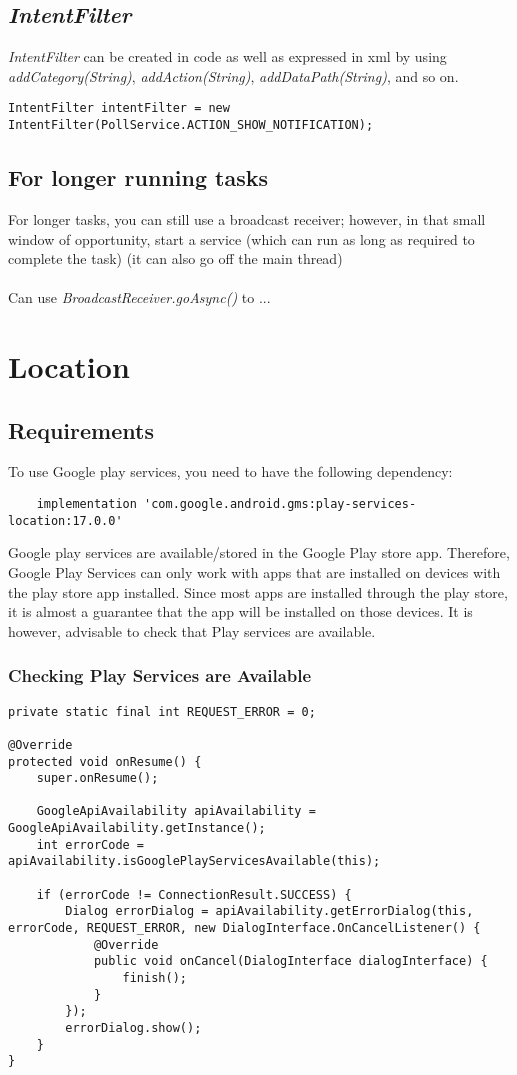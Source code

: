 \documentclass[]{article}
\renewcommand{\it}[1]{\textit{#1}}
\begin{document}
\subsection{\it{IntentFilter}}
\it{IntentFilter} can be created in code as well as expressed in xml by using \it{addCategory(String)}, \it{addAction(String)}, \it{addDataPath(String)}, and so on.
\begin{lstlisting}
IntentFilter intentFilter = new IntentFilter(PollService.ACTION_SHOW_NOTIFICATION);
\end{lstlisting}

\subsection{For longer running tasks}
For longer tasks, you can still use a broadcast receiver; however, in that small window of opportunity, start a service (which can run as long as required to complete the task) (it can also go off the main thread)
\\\\
Can use \it{BroadcastReceiver.goAsync()} to ...

\section{Location}
\subsection{Requirements}
To use Google play services, you need to have the following dependency:
\begin{lstlisting}
    implementation 'com.google.android.gms:play-services-location:17.0.0'
\end{lstlisting}
Google play services are available/stored in the Google Play store app.  Therefore, Google Play Services can only work with apps that are installed on devices with the play store app installed.  Since most apps are installed through the play store, it is almost a guarantee that the app will be installed on those devices.  It is however, advisable to check that Play services are available.

\subsubsection{Checking Play Services are Available} 
\begin{lstlisting}
private static final int REQUEST_ERROR = 0;

@Override
protected void onResume() {
	super.onResume();
	
	GoogleApiAvailability apiAvailability = GoogleApiAvailability.getInstance();
	int errorCode = apiAvailability.isGooglePlayServicesAvailable(this);
	
	if (errorCode != ConnectionResult.SUCCESS) {
		Dialog errorDialog = apiAvailability.getErrorDialog(this, errorCode, REQUEST_ERROR, new DialogInterface.OnCancelListener() {
			@Override
			public void onCancel(DialogInterface dialogInterface) {
				finish();
			}
		});
		errorDialog.show();
	}
}
\end{lstlisting}
\end{document}

